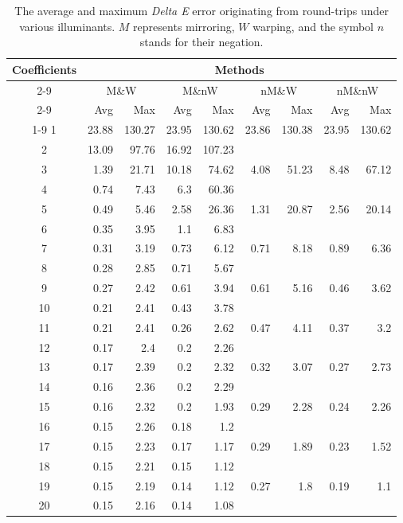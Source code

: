 \begin{table}[t]
	\centering
	\begin{tabular}{crrrrrrrr}
		\toprule
		\multirow{4}{*}{Coefficients} &
		\multicolumn{8}{c}{Methods} \\
		\cmidrule(lr){2-9}
		&\multicolumn{2}{c}{M\&W} &
		\multicolumn{2}{c}{M\&nW} &
		\multicolumn{2}{c}{nM\&W} &
		\multicolumn{2}{c}{nM\&nW}\\
		\cmidrule(lr){2-9}
		& Avg & Max & Avg & Max & Avg & Max & Avg & Max \\
		\cmidrule(lr){1-9}
		1&23.88&130.27&23.95&130.62&23.86&130.38&23.95&130.62\\
		2&13.09&97.76&16.92&107.23&\textemdash&\textemdash&\textemdash&\textemdash\\
		3&1.39&21.71&10.18&74.62&4.08&51.23&8.48&67.12\\
		4&0.74&7.43&6.3&60.36&\textemdash&\textemdash&\textemdash&\textemdash\\
		5&0.49&5.46&2.58&26.36&1.31&20.87&2.56&20.14\\
		6&0.35&3.95&1.1&6.83&\textemdash&\textemdash&\textemdash&\textemdash\\
		7&0.31&3.19&0.73&6.12&0.71&8.18&0.89&6.36\\
		8&0.28&2.85&0.71&5.67&\textemdash&\textemdash&\textemdash&\textemdash\\
		9&0.27&2.42&0.61&3.94&0.61&5.16&0.46&3.62\\
		10&0.21&2.41&0.43&3.78&\textemdash&\textemdash&\textemdash&\textemdash\\
		11&0.21&2.41&0.26&2.62&0.47&4.11&0.37&3.2\\
		12&0.17&2.4&0.2&2.26&\textemdash&\textemdash&\textemdash&\textemdash\\
		13&0.17&2.39&0.2&2.32&0.32&3.07&0.27&2.73\\
		14&0.16&2.36&0.2&2.29&\textemdash&\textemdash&\textemdash&\textemdash\\
		15&0.16&2.32&0.2&1.93&0.29&2.28&0.24&2.26\\
		16&0.15&2.26&0.18&1.2&\textemdash&\textemdash&\textemdash&\textemdash\\
		17&0.15&2.23&0.17&1.17&0.29&1.89&0.23&1.52\\
		18&0.15&2.21&0.15&1.12&\textemdash&\textemdash&\textemdash&\textemdash\\
		19&0.15&2.19&0.14&1.12&0.27&1.8&0.19&1.1\\
		20&0.15&2.16&0.14&1.08&\textemdash&\textemdash&\textemdash&\textemdash\\
		\bottomrule
	\end{tabular}
	\caption{The average and maximum \emph{Delta E} error originating from round-trips under various illuminants. $M$ represents mirroring, $W$ warping, and the symbol $n$ stands for their negation.}
	\label{table:comparisonMomentTechnique}
\end{table}

